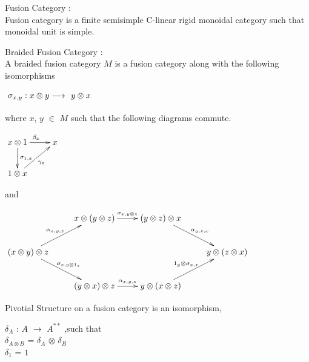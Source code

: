 \begin{defn}
    Fusion Category :\\
	    Fusion category is a finite semisimple C-linear rigid monoidal category such that monoidal unit is simple.
\end{defn}

\begin{defn}
Braided Fusion Category :\\
      A braided fusion category $M$ is a fusion category along with the 
following isomorphisms 
\begin{center}
	  $\xymatrix{
	    \sigma_{x,y} : x \otimes y \longrightarrow^{~} y \otimes x
	   }$
	  \end{center} where $x$, $y$ $\in$ $M$
such that the following diagrams commute.
	\begin{center}
	$\xymatrix{
	x \otimes 1 \ar[r]^{\beta_{x}}  \ar[d]^{\sigma_{1,x}} & x \\
	1 \otimes x \ar[ur]_{\gamma_{x}} &
	}$
      \end{center}
and 
      \begin{center}
      $\xymatrix{
        &x\otimes (y \otimes z) \ar[r]^{\sigma_{x,y \otimes z}} &(y \otimes z) \otimes x \ar[dr]^{\alpha_{y,z,x}} & \\
        (x \otimes y) \otimes z \ar[ur]^{\alpha_{x,y,z}} \ar[dr]^{\sigma_{x,y \otimes 1_{z}}}    & & &y \otimes (z \otimes x) \\
	&(y \otimes x) \otimes z \ar[r]^{\alpha_{x,y,z}} & y \otimes (x \otimes z) \ar[ur]^{1_{y} \otimes \sigma_{x,z}} & 
      }$
      \end{center}
\end{defn}


\begin{defn}
Pivotial Structure on a fusion category is an isomorphism, \\
\begin{center}
  $\delta_{A}$ : $A$ $\rightarrow$ $A^{**}$ ,such that \\
  $\delta_{A \otimes B}$ = $\delta_{A}$ $\otimes$ $\delta_{B}$ \\
  $\delta_{1}$ = $1$
\end{center}
\end{defn}

